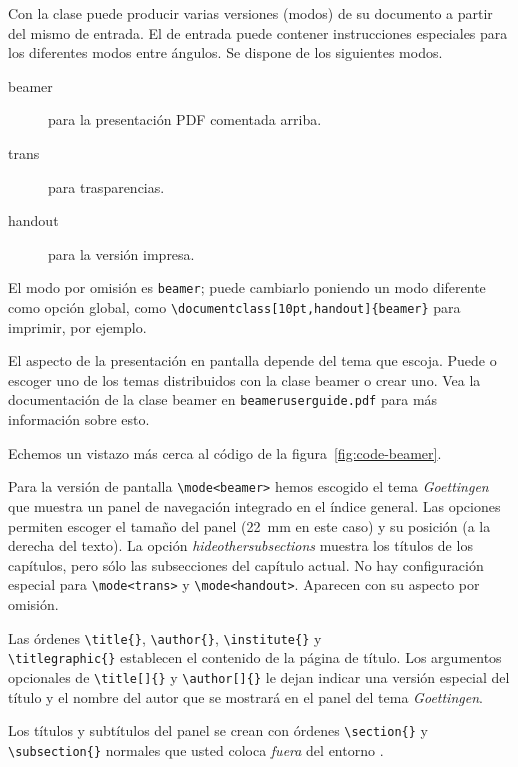 Con la clase  puede producir varias versiones (modos) de su documento a partir del mismo \filenomo{} de entrada.  El \filenomo{} de entrada puede contener instrucciones especiales para los diferentes modos entre ángulos.  Se dispone de los siguientes modos.

\begin{description}
    \item[beamer] para la presentación PDF comentada arriba.
    \item[trans] para trasparencias.
    \item[handout] para la versión impresa.
\end{description}
El modo por omisión es \texttt{beamer}; puede cambiarlo poniendo un modo diferente como opción global, como \verb|\documentclass[10pt,handout]{beamer}| para imprimir, por ejemplo.

El aspecto de la presentación en pantalla depende del tema que escoja.  Puede o escoger uno de los temas distribuidos con la clase beamer o crear uno.  Vea la documentación de la clase beamer en \texttt{beameruserguide.pdf} para más información sobre esto.

Echemos un vistazo más cerca al código de la figura~\ref{fig:code-beamer}.

Para la versión de pantalla \verb|\mode<beamer>| hemos escogido el tema \emph{Goettingen} que muestra un panel de navegación integrado en el índice general.  Las opciones permiten escoger el tamaño del panel (22~mm en este caso) y su posición (a la derecha del texto).  La opción \emph{hideothersubsections} muestra los títulos de los capítulos, pero sólo las subsecciones del capítulo actual.  No hay configuración especial para \verb|\mode<trans>| y \verb|\mode<handout>|.  Aparecen con su aspecto por omisión.

Las órdenes \verb|\title{}|, \verb|\author{}|, \verb|\institute{}| y\\ \verb|\titlegraphic{}| establecen el contenido de la página de título. Los argumentos opcionales de \verb|\title[]{}| y \verb|\author[]{}| le dejan indicar una versión especial del título y el nombre del autor que se mostrará en el panel del tema \emph{Goettingen}.

Los títulos y subtítulos del panel se crean con órdenes \verb|\section{}| y \verb|\subsection{}| normales que usted coloca \emph{fuera} del entorno .

